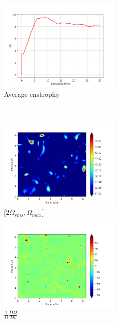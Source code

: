 \newpage

\begin{figure}[H]
    \begin{subfigure}[H]{0.45\textwidth}
        \includegraphics[height=1.75in]{media/run-cds-65/enst-average1335.png}
        \caption{Average enstrophy}
    \end{subfigure}
    ~
    \begin{subfigure}[H]{0.45\textwidth}
        \includegraphics[height=1.75in]{media/run-cds-65/enst-2-1335.png}
        \caption{$[2\Omega_{rms}, \Omega_{max} $] }
    \end{subfigure}
    \newline
    \begin{subfigure}[H]{0.45\textwidth}
        \includegraphics[height=1.75in]{media/run-cds-65/enst-1335.png}
        \caption{$\frac{1}{\Omega} \frac{D \Omega}{Dt}$}
    \end{subfigure}
    ~
    \begin{subfigure}{0.45\textwidth}

\end{subfigure}
\end{figure}
